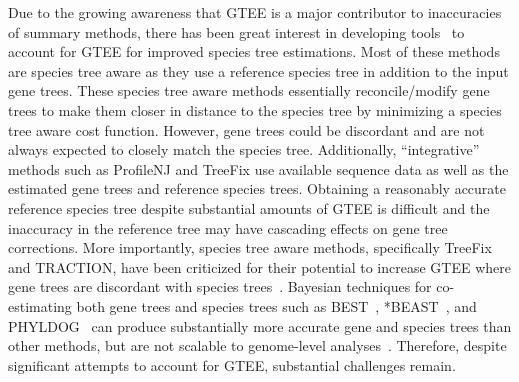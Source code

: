 \documentclass[10pt,a4paper]{article}
\newcommand{\add}[1]{{\color{blue} #1}}
\begin{document}
Due to the growing awareness that GTEE is a major contributor to inaccuracies of summary methods, there has been great interest in developing tools~\cite{notung,treefix,rasmussen2011bayesian,traction,profilenj,tt,treefix-dtl-bansal2015improved,nguyen2012accounting,jacox2017resolution,lafond2017gene} to account for GTEE for improved species tree estimations. Most of these methods are species tree aware as they use a reference species tree in addition to the input gene trees. These species tree aware  methods essentially reconcile/modify gene trees to make them closer in distance to the species tree by minimizing a species tree aware cost function. However, gene trees could be discordant and are not always expected to closely match the species tree. %
Additionally, ``integrative'' methods such as ProfileNJ and TreeFix use available sequence data as well as the estimated gene trees and reference species trees. Obtaining a reasonably accurate reference species tree despite substantial amounts of GTEE is difficult and the inaccuracy in the reference tree may have cascading effects on gene tree corrections. More importantly, species tree aware methods, specifically TreeFix and TRACTION, have been criticized for their potential to increase GTEE where gene trees are discordant with species trees~\cite{zhiyan}. Bayesian techniques for co-estimating both gene trees and species trees such as BEST~\cite{best}, *BEAST~\cite{heled-drummond}, and PHYLDOG~\cite{boussau2013genome} 
can produce substantially more accurate gene and species trees than other methods, but are not scalable to genome-level analyses~\cite{bayzid2013naive,smith2013target,bayzid-incomplete,leache-rannala,szollHosi2015inference}.
Therefore, despite significant attempts to account for GTEE, substantial challenges remain.



\end{document}
